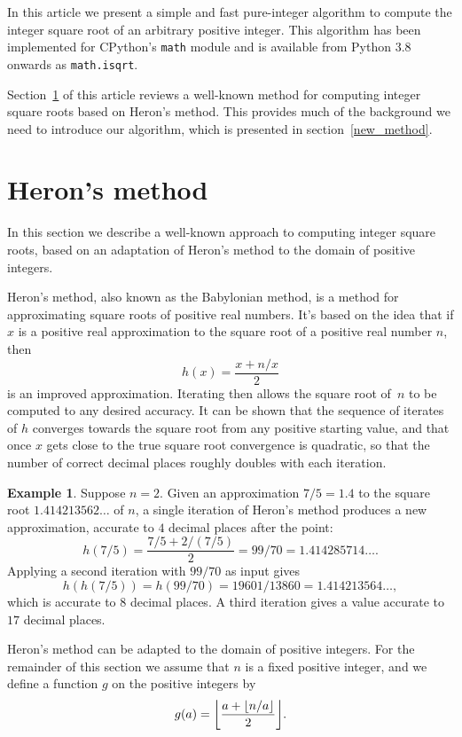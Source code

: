 \documentclass[a4paper]{article}
\DeclarePairedDelimiter\floor{\lfloor}{\rfloor}
\theoremstyle{plain}
\theoremstyle{definition}
\newtheorem{example}[theorem]{Example}
\begin{document}
In this article we present a simple and fast pure-integer algorithm to compute
the integer square root of an arbitrary positive integer. This algorithm has
been implemented for CPython's \lstinline{math} module and is available from
Python 3.8 onwards as \lstinline{math.isqrt}.

Section~\ref{old_method} of this article reviews a well-known method for
computing integer square roots based on Heron's method. This provides much of
the background we need to introduce our algorithm, which is presented in
section~\ref{new_method}.

\section{Heron's method}
\label{old_method}

In this section we describe a well-known approach to computing integer square
roots, based on an adaptation of Heron's method to the domain of positive
integers.

Heron's method, also known as the Babylonian method, is a method for
approximating square roots of positive real numbers. It's based on the idea
that if $x$ is a positive real approximation to the square root of a positive
real number $n$, then
$$h(x) = \frac{x + n/x}2$$ is an improved approximation. Iterating then
allows the square root of~$n$ to be computed to any desired accuracy. It can be
shown that the sequence of iterates of $h$ converges towards the square root
from any positive starting value, and that once $x$ gets close to
the true square root convergence is quadratic, so that the number of
correct decimal places roughly doubles with each iteration.

\begin{example}
  Suppose $n=2$. Given an approximation $7/5 = 1.4$ to the square root
  $1.414213562\dots$ of $n$, a single iteration of Heron's method produces a
  new approximation, accurate to $4$ decimal places after the point:
  $$h(7/5) = \frac{7/5 + 2/(7/5)}2 = 99/70 = 1.414285714\dots.$$ Applying a
  second iteration with $99/70$ as input gives
  $$h(h(7/5)) = h(99/70) = 19601/13860 =
  1.414213564\dots,$$ which is accurate to $8$ decimal places. A third
  iteration gives a value accurate to $17$ decimal places.
\end{example}

Heron's method can be adapted to the domain of positive integers. For the
remainder of this section we assume that $n$ is a fixed positive integer, and
we define a function $g$ on the positive integers by
$$g(a) = \floor*{\frac{a + \floor{n/a}}2}.$$
\end{document}
